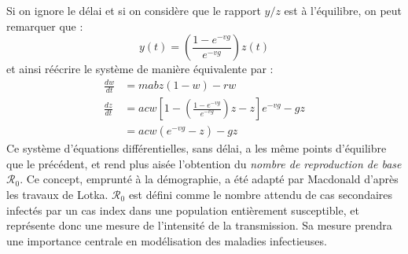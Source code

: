 Si on ignore le délai et si on considère que le rapport $y/z$ est à l'équilibre, on peut remarquer que :
\begin{equation}
y(t) = \left( \frac{1-e^{-vg}}{e^{-vg}} \right)z(t)
\end{equation}
et ainsi réécrire le système de manière équivalente par :
\begin{align}
\label{eq:eqRMb1}
\frac{dw}{dt} &= mabz(1-w) - rw \\
\label{eq:eqRMb2}
\frac{dz}{dt} &= acw\left[ 1- \left( \frac{1-e^{-vg}}{e^{-vg}} \right)z - z \right]e^{-vg} - gz \\ \nonumber
			  &= acw(e^{-vg}-z) - gz 
\end{align}
Ce système d'équations différentielles, sans délai, a les même points d'équilibre que le précédent, et rend plus aisée l'obtention du \textit{nombre de reproduction de base} $\mathcal{R}_0$.
Ce concept, emprunté à la démographie, a été adapté par Macdonald d'après les travaux de Lotka.
$\mathcal{R}_0$ est défini comme le nombre attendu de cas secondaires infectés par un cas index dans une population entièrement susceptible, et représente donc une mesure de l'intensité de la transmission. Sa mesure prendra une importance centrale en modélisation des maladies infectieuses. 


